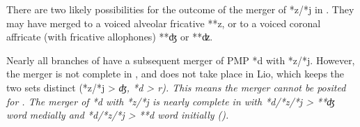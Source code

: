 There are two likely possibilities for the outcome of the merger
of *z/*j in .
They may have merged to a voiced alveolar fricative **z,
or to a voiced coronal affricate (with fricative allophones) **ʤ or **ʣ.

Nearly all branches of  have a subsequent merger
of PMP *d with *z/*j.
However, the merger is not complete in ,
and does not take place in Lio, which keeps the two sets distinct
(*z/*j > \it{ʤ}, *d > \it{r}).
This means the merger cannot be posited for .
The merger of *d with *z/*j is nearly complete in 
with *d/*z/*j > **ʤ word medially
and *d/*z/*j > **d word initially ().
